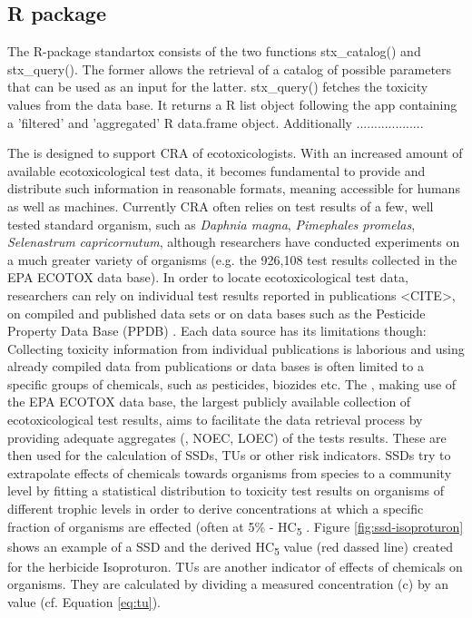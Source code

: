 \subsection*{R package}

The R-package standartox consists of the two functions stx\_catalog() and stx\_query(). The former allows the retrieval of a catalog of possible parameters that can be used as an input for the latter. stx\_query() fetches the toxicity values from the data base. It returns a R list object following the app containing a 'filtered' and 'aggregated' R data.frame object. Additionally ...................







The \etoxbase{} is designed to support CRA of ecotoxicologists. With an increased amount of available ecotoxicological test data, it becomes fundamental to provide and distribute such information in reasonable formats, meaning accessible for humans as well as machines. Currently CRA often relies on test results of a few, well tested standard organism, such as \textit{Daphnia magna}, \textit{Pimephales promelas}, \textit{Selenastrum capricornutum}, although researchers have conducted experiments on a much greater variety of organisms (e.g. the 926,108 test results collected in the EPA ECOTOX data base). In order to locate ecotoxicological test data, researchers can rely on individual test results reported in publications <CITE>, on compiled and published data sets \citep{malaj_organic_2014} or on data bases such as the Pesticide Property Data Base (PPDB) \citep{lewis_international_2016}. Each data source has its limitations though: Collecting toxicity information from individual publications is laborious and using already compiled data from publications or data bases is often limited to a specific groups of chemicals, such as pesticides, biozides etc. The \etoxbase{}, making use of the EPA ECOTOX data base, the largest publicly available collection of ecotoxicological test results, aims to facilitate the data retrieval process by providing adequate aggregates (\ecfifty{}, NOEC, LOEC) of the tests results. These are then used for the calculation of SSDs, TUs or other risk indicators. SSDs try to extrapolate effects of chemicals towards organisms from species to a community level by fitting a statistical distribution to toxicity test results on organisms of different trophic levels in order to derive concentrations at which a specific fraction of organisms are effected (often at 5\% - HC\textsubscript{5} \citep{posthuma_species_2002}. Figure \ref{fig:ssd-isoproturon} shows an example of a SSD and the derived HC\textsubscript{5} value (red dassed line) created for the herbicide Isoproturon. TUs are another indicator of effects of chemicals on organisms. They are calculated by dividing a measured concentration (c) by an \ecfifty{} value (cf. Equation \ref{eq:tu}).

